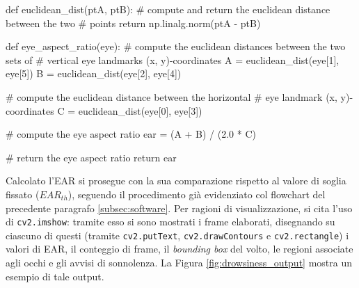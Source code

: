 \documentclass[12pt]{article}
\begin{document}
\begin{python}
	def euclidean_dist(ptA, ptB):
		# compute and return the euclidean distance between the two
		# points
		return np.linalg.norm(ptA - ptB)
	
	def eye_aspect_ratio(eye):
		# compute the euclidean distances between the two sets of
		# vertical eye landmarks (x, y)-coordinates
		A = euclidean_dist(eye[1], eye[5])
		B = euclidean_dist(eye[2], eye[4])
		
		# compute the euclidean distance between the horizontal
		# eye landmark (x, y)-coordinates
		C = euclidean_dist(eye[0], eye[3])
		
		# compute the eye aspect ratio
		ear = (A + B) / (2.0 * C)
		
		# return the eye aspect ratio
		return ear
\end{python}

\vspace{0.3cm}
Calcolato l'EAR si prosegue con la sua comparazione rispetto al valore di soglia fissato ($EAR_{th}$), seguendo il procedimento già evidenziato col flowchart del precedente paragrafo \ref{subsec:software}. Per ragioni di visualizzazione, si cita l'uso di \texttt{cv2.imshow}: tramite esso si sono mostrati i frame elaborati, disegnando su ciascuno di questi (tramite \texttt{cv2.putText}, \texttt{cv2.drawContours} e \texttt{cv2.rectangle}) i valori di EAR, il conteggio di frame, il \textit{bounding box} del volto, le regioni associate agli occhi e gli avvisi di sonnolenza. La Figura \ref{fig:drowsiness_output} mostra un esempio di tale output.
\end{document}
